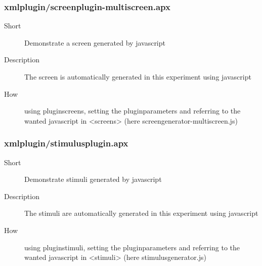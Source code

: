 \subsubsection{xmlplugin/screenplugin-multiscreen.apx}
\begin{description}
\item[Short] 
 Demonstrate a screen generated by javascript
\item[Description] 
 The screen is automatically generated in this experiment using javascript
\item[How] 
 using pluginscreens, setting the pluginparameters and referring to the wanted javascript in \textless{}screens\textgreater{} (here screengenerator-multiscreen.js)
\end{description}

\subsubsection{xmlplugin/stimulusplugin.apx}
\begin{description}
\item[Short] 
 Demonstrate stimuli generated by javascript
\item[Description] 
 The stimuli are automatically generated in this experiment using javascript
\item[How] 
 using pluginstimuli, setting the pluginparameters and referring to the wanted javascript in \textless{}stimuli\textgreater{} (here stimulusgenerator.js)
\end{description}


